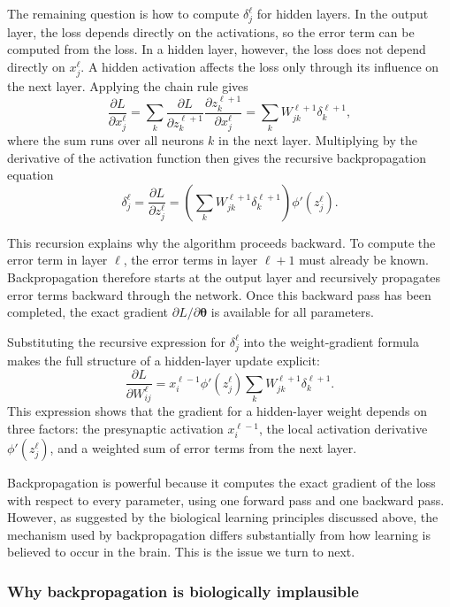 The remaining question is how to compute \(\delta_j^\ell\) for hidden layers. In the output layer, the loss depends directly on the activations, so the error term can be computed from the loss. In a hidden layer, however, the loss does not depend directly on \(x_j^\ell\). A hidden activation affects the loss only through its influence on the next layer. Applying the chain rule gives
\[
\frac{\partial L}{\partial x_j^\ell}
=
\sum_k
\frac{\partial L}{\partial z_k^{\ell+1}}
\frac{\partial z_k^{\ell+1}}{\partial x_j^\ell}
=
\sum_k
W_{jk}^{\ell+1}
\delta_k^{\ell+1},
\]
where the sum runs over all neurons \(k\) in the next layer. Multiplying by the derivative of the activation function then gives the recursive backpropagation equation
\[
\delta_j^\ell
=
\frac{\partial L}{\partial z_j^\ell}
=
\left(
\sum_k
W_{jk}^{\ell+1}
\delta_k^{\ell+1}
\right)
\phi'(z_j^\ell).
\]

This recursion explains why the algorithm proceeds backward. To compute the error term in layer \(\ell\), the error terms in layer \(\ell+1\) must already be known. Backpropagation therefore starts at the output layer and recursively propagates error terms backward through the network. Once this backward pass has been completed, the exact gradient \(\partial L / \partial \boldsymbol{\theta}\) is available for all parameters.

Substituting the recursive expression for \(\delta_j^\ell\) into the weight-gradient formula makes the full structure of a hidden-layer update explicit:
\begin{equation}
\frac{\partial L}{\partial W_{ij}^{\ell}}
=
x_i^{\ell-1}
\phi'\!\left(z_j^{\ell}\right)
\sum_k
W_{jk}^{\ell+1}
\delta_k^{\ell+1}.
\label{eq:full_backprop_weight}
\end{equation}
This expression shows that the gradient for a hidden-layer weight depends on three factors: the presynaptic activation \(x_i^{\ell-1}\), the local activation derivative \(\phi'(z_j^\ell)\), and a weighted sum of error terms from the next layer.

Backpropagation is powerful because it computes the exact gradient of the loss with respect to every parameter, using one forward pass and one backward pass. However, as suggested by the biological learning principles discussed above, the mechanism used by backpropagation differs substantially from how learning is believed to occur in the brain. This is the issue we turn to next.

\subsubsection{Why backpropagation is biologically implausible}

